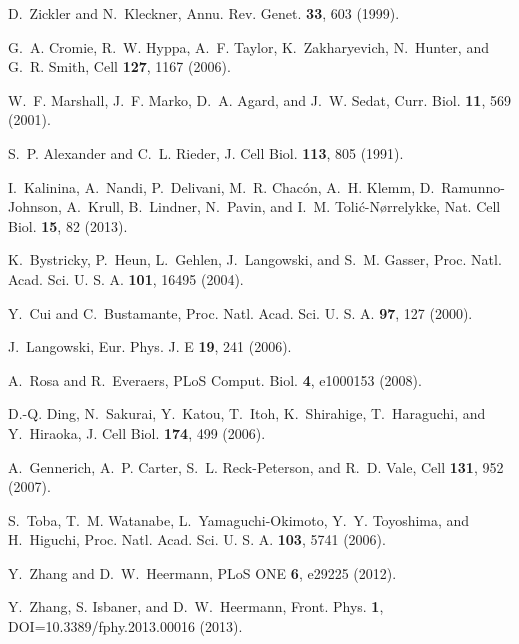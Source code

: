 \documentclass[aps,showpacs,twocolumn,floatfix,prx,superscriptaddress]{revtex4-1}
\begin{document}
\begin{thebibliography}{10}
D.~Zickler and
  N.~Kleckner,
  Annu. Rev. Genet. \textbf{33},
  603 (1999).

G.~A. Cromie,
  R.~W. Hyppa,
  A.~F. Taylor,
  K.~Zakharyevich,
  N.~Hunter, and
  G.~R. Smith,
  Cell \textbf{127}, 1167
  (2006).

W.~F. Marshall,
  J.~F. Marko,
  D.~A. Agard, and
  J.~W. Sedat,
  Curr. Biol. \textbf{11},
  569 (2001).

S.~P. Alexander
  and C.~L.
  Rieder, J. Cell Biol.
  \textbf{113}, 805 (1991).

I.~Kalinina,
  A.~Nandi,
  P.~Delivani,
  M.~R. Chac\'on,
  A.~H. Klemm,
  D.~Ramunno-Johnson,
  A.~Krull,
  B.~Lindner,
  N.~Pavin, and
  I.~M. Toli\'c-N{\o}rrelykke,
  Nat. Cell Biol. \textbf{15},
  82 (2013).

K.~Bystricky,
  P.~Heun,
  L.~Gehlen,
  J.~Langowski,
  and S.~M.
  Gasser, Proc. Natl. Acad. Sci. U. S. A.
  \textbf{101}, 16495
  (2004).

Y.~Cui and
  C.~Bustamante,
  Proc. Natl. Acad. Sci. U. S. A.
  \textbf{97}, 127 (2000).

J.~Langowski,
  Eur. Phys. J. E \textbf{19}, 241
  (2006).

A.~Rosa and
  R.~Everaers,
  PLoS Comput. Biol. \textbf{4},
  e1000153 (2008).

D.-Q. Ding,
  N.~Sakurai,
  Y.~Katou,
  T.~Itoh,
  K.~Shirahige,
  T.~Haraguchi,
  and Y.~Hiraoka,
  J. Cell Biol.
  \textbf{174}, 499 (2006).

A.~Gennerich,
  A.~P. Carter,
  S.~L. Reck-Peterson,
  and R.~D. Vale,
  Cell \textbf{131}, 952
  (2007).

S.~Toba,
  T.~M. Watanabe,
  L.~Yamaguchi-Okimoto,
  Y.~Y. Toyoshima,
  and H.~Higuchi,
  Proc. Natl. Acad. Sci. U. S. A.
  \textbf{103}, 5741 (2006).
  
 Y.~Zhang and D.~W.~Heermann, PLoS ONE \textbf{6}, e29225 (2012).
 
Y.~Zhang, S. Isbaner, and D.~W.~Heermann, Front. Phys. \textbf{1}, DOI=10.3389/fphy.2013.00016 (2013).
\end{thebibliography}

\end{document}
